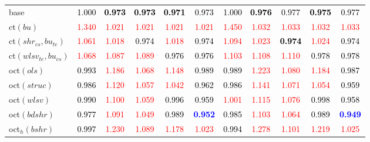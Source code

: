 \begin{tabular}[t]{l|>{}cccc>{}c|ccccc}
base & \textcolor{black}{1.000} & \textcolor{black}{\textbf{0.973}} & \textcolor{black}{\textbf{0.973}} & \textcolor{black}{\textbf{0.971}} & \textcolor{black}{0.973} & \textcolor{black}{1.000} & \textcolor{black}{\textbf{0.976}} & \textcolor{black}{0.977} & \textcolor{black}{\textbf{0.975}} & \textcolor{black}{0.977}\\
ct$(bu)$ & \textcolor{red}{1.340} & \textcolor{red}{1.021} & \textcolor{red}{1.021} & \textcolor{red}{1.021} & \textcolor{red}{1.021} & \textcolor{red}{1.450} & \textcolor{red}{1.032} & \textcolor{red}{1.033} & \textcolor{red}{1.032} & \textcolor{red}{1.033}\\
ct$(shr_{cs}, bu_{te})$ & \textcolor{red}{1.061} & \textcolor{red}{1.018} & \textcolor{black}{0.974} & \textcolor{red}{1.018} & \textcolor{black}{0.974} & \textcolor{red}{1.094} & \textcolor{red}{1.023} & \textcolor{black}{\textbf{0.974}} & \textcolor{red}{1.024} & \textcolor{black}{0.974}\\
ct$(wlsv_{te}, bu_{cs})$ & \textcolor{red}{1.068} & \textcolor{red}{1.087} & \textcolor{red}{1.089} & \textcolor{black}{0.976} & \textcolor{black}{0.976} & \textcolor{red}{1.103} & \textcolor{red}{1.108} & \textcolor{red}{1.110} & \textcolor{black}{0.978} & \textcolor{black}{0.978}\\
oct$(ols)$ & \textcolor{black}{0.993} & \textcolor{red}{1.186} & \textcolor{red}{1.068} & \textcolor{red}{1.148} & \textcolor{black}{0.989} & \textcolor{black}{0.989} & \textcolor{red}{1.223} & \textcolor{red}{1.080} & \textcolor{red}{1.184} & \textcolor{black}{0.987}\\
oct$(struc)$ & \textcolor{black}{0.986} & \textcolor{red}{1.120} & \textcolor{red}{1.057} & \textcolor{red}{1.042} & \textcolor{black}{0.962} & \textcolor{black}{0.986} & \textcolor{red}{1.141} & \textcolor{red}{1.071} & \textcolor{red}{1.054} & \textcolor{black}{0.959}\\
oct$(wlsv)$ & \textcolor{black}{0.990} & \textcolor{red}{1.100} & \textcolor{red}{1.059} & \textcolor{black}{0.996} & \textcolor{black}{0.959} & \textcolor{red}{1.001} & \textcolor{red}{1.115} & \textcolor{red}{1.076} & \textcolor{black}{0.998} & \textcolor{black}{0.958}\\
oct$(bdshr)$ & \textcolor{black}{0.977} & \textcolor{red}{1.091} & \textcolor{red}{1.049} & \textcolor{black}{0.989} & \textcolor{blue}{\textbf{0.952}} & \textcolor{black}{0.985} & \textcolor{red}{1.103} & \textcolor{red}{1.064} & \textcolor{black}{0.989} & \textcolor{blue}{\textbf{0.949}}\\
oct$_h(bshr)$ & \textcolor{black}{0.997} & \textcolor{red}{1.230} & \textcolor{red}{1.089} & \textcolor{red}{1.178} & \textcolor{red}{1.023} & \textcolor{black}{0.994} & \textcolor{red}{1.278} & \textcolor{red}{1.101} & \textcolor{red}{1.219} & \textcolor{red}{1.025}\\

\end{tabular}
